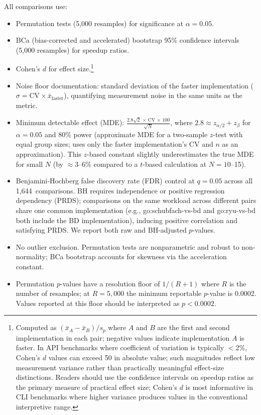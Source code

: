 All comparisons use:
\begin{itemize}
\item Permutation tests (5{,}000 resamples) for significance at
      $\alpha = 0.05$.
\item BCa (bias-corrected and accelerated) bootstrap 95\% confidence
      intervals (5{,}000 resamples) for speedup ratios.
\item Cohen's $d$ for effect size.\footnote{Computed as
      $(\bar{x}_A - \bar{x}_B) / s_p$ where $A$ and $B$ are the first
      and second implementation in each pair; negative values indicate
      implementation $A$ is faster.  In API benchmarks where coefficient
      of variation is typically ${<}$2\%, Cohen's $d$ values can exceed
      50 in absolute value; such magnitudes reflect low measurement
      variance rather than practically meaningful effect-size
      distinctions.  Readers should use the confidence intervals on
      speedup ratios as the primary measure of practical effect size;
      Cohen's $d$ is most informative in CLI benchmarks where higher
      variance produces values in the conventional interpretive range.}
\item Noise floor documentation: standard deviation of the faster
      implementation ($\sigma = \text{CV} \times \bar{x}_\text{faster}$),
      quantifying measurement noise in the same units as the metric.
\item Minimum detectable effect (MDE):
      $\frac{2.8 \sqrt{2}\,\times\,\text{CV}\,\times\,100}{\sqrt{N}}$,
      where $2.8 \approx z_{\alpha/2} + z_\beta$ for $\alpha = 0.05$ and
      80\% power (approximate MDE for a two-sample $z$-test with equal
      group sizes; uses only the faster implementation's CV and $n$ as an
      approximation).  This $z$-based constant slightly underestimates
      the true MDE for small $N$ (by ${\approx}3$--6\% compared to a
      $t$-based calculation at $N{=}10$--15).
\item Benjamini-Hochberg false discovery rate (FDR) control at $q = 0.05$
      across all 1{,}644~comparisons.  BH requires independence or positive
      regression dependency (PRDS); comparisons on the same workload across
      different pairs share one common implementation (e.g.,
      go:schubfach-vs-bd and go:ryu-vs-bd both include the BD
      implementation), inducing positive correlation and satisfying PRDS.  We report
      both raw and BH-adjusted $p$-values.
\item No outlier exclusion.  Permutation tests are nonparametric and
      robust to non-normality; BCa bootstrap accounts for skewness via the
      acceleration constant.
\item Permutation $p$-values have a resolution floor of
      $1/(R+1)$ where $R$ is the number of resamples; at $R = 5{,}000$
      the minimum reportable $p$-value is 0.0002.  Values reported at
      this floor should be interpreted as $p < 0.0002$.
\end{itemize}

